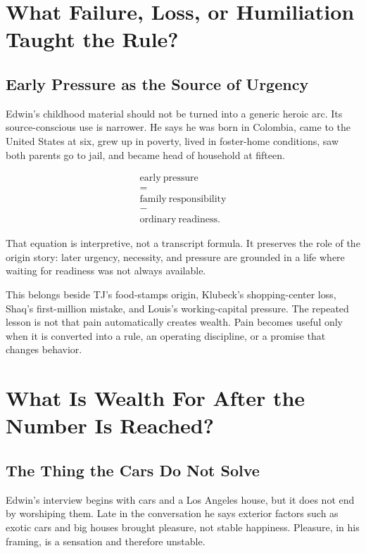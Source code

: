 \documentclass[11pt,oneside]{book}
\begin{document}
\chapter{What Failure, Loss, or Humiliation Taught the Rule?}

\section{Early Pressure as the Source of Urgency}

Edwin's childhood material should not be turned into a generic heroic arc. Its source-conscious use is narrower. He says he was born in Colombia, came to the United States at six, grew up in poverty, lived in foster-home conditions, saw both parents go to jail, and became head of household at fifteen.

\begin{equation}
\begin{gathered}
\mathrm{early\ pressure}\\
=\\
\mathrm{family\ responsibility}\\
-\\
\mathrm{ordinary\ readiness}.
\end{gathered}
\end{equation}

That equation is interpretive, not a transcript formula. It preserves the role of the origin story: later urgency, necessity, and pressure are grounded in a life where waiting for readiness was not always available.

This belongs beside TJ's food-stamps origin, Klubeck's shopping-center loss, Shaq's first-million mistake, and Louis's working-capital pressure. The repeated lesson is not that pain automatically creates wealth. Pain becomes useful only when it is converted into a rule, an operating discipline, or a promise that changes behavior.

\chapter{What Is Wealth For After the Number Is Reached?}

\section{The Thing the Cars Do Not Solve}

Edwin's interview begins with cars and a Los Angeles house, but it does not end by worshiping them. Late in the conversation he says exterior factors such as exotic cars and big houses brought pleasure, not stable happiness. Pleasure, in his framing, is a sensation and therefore unstable.
\end{document}
